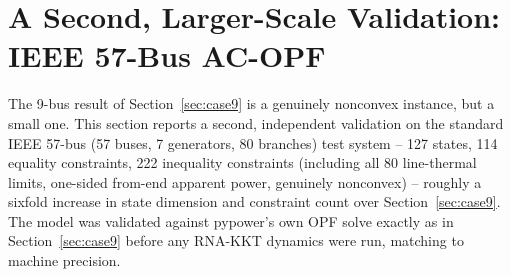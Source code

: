 \documentclass[11pt,onecolumn]{article}
\theoremstyle{definition}
\theoremstyle{remark}
\begin{document}
\section{A Second, Larger-Scale Validation: IEEE 57-Bus AC-OPF} \label{sec:case57}

The 9-bus result of Section~\ref{sec:case9} is a genuinely nonconvex instance, but a small one.
This section reports a second, independent validation on the standard IEEE 57-bus (57 buses, 7
generators, 80 branches) test system \cite{zimmerman2011} -- 127 states, 114 equality
constraints, 222 inequality constraints (including all 80 line-thermal limits, one-sided
from-end apparent power, genuinely nonconvex) -- roughly a sixfold increase in state dimension
and constraint count over Section~\ref{sec:case9}. The model was validated against pypower's
own OPF solve exactly as in Section~\ref{sec:case9} before any RNA-KKT dynamics were run,
matching to machine precision.

\end{document}

